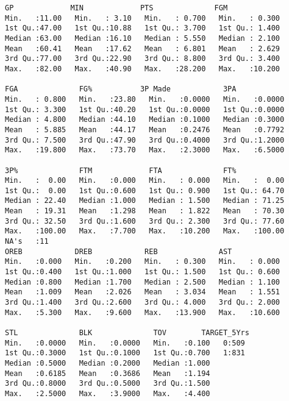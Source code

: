 \documentclass[10pt]{article}
\begin{document}
\begin{verbatim}
GP             MIN             PTS              FGM        
Min.   :11.00   Min.   : 3.10   Min.   : 0.700   Min.   : 0.300  
1st Qu.:47.00   1st Qu.:10.88   1st Qu.: 3.700   1st Qu.: 1.400  
Median :63.00   Median :16.10   Median : 5.550   Median : 2.100  
Mean   :60.41   Mean   :17.62   Mean   : 6.801   Mean   : 2.629  
3rd Qu.:77.00   3rd Qu.:22.90   3rd Qu.: 8.800   3rd Qu.: 3.400  
Max.   :82.00   Max.   :40.90   Max.   :28.200   Max.   :10.200  

FGA              FG%           3P Made            3PA        
Min.   : 0.800   Min.   :23.80   Min.   :0.0000   Min.   :0.0000  
1st Qu.: 3.300   1st Qu.:40.20   1st Qu.:0.0000   1st Qu.:0.0000  
Median : 4.800   Median :44.10   Median :0.1000   Median :0.3000  
Mean   : 5.885   Mean   :44.17   Mean   :0.2476   Mean   :0.7792  
3rd Qu.: 7.500   3rd Qu.:47.90   3rd Qu.:0.4000   3rd Qu.:1.2000  
Max.   :19.800   Max.   :73.70   Max.   :2.3000   Max.   :6.5000  

3P%              FTM             FTA              FT%        
Min.   :  0.00   Min.   :0.000   Min.   : 0.000   Min.   :  0.00  
1st Qu.:  0.00   1st Qu.:0.600   1st Qu.: 0.900   1st Qu.: 64.70  
Median : 22.40   Median :1.000   Median : 1.500   Median : 71.25  
Mean   : 19.31   Mean   :1.298   Mean   : 1.822   Mean   : 70.30  
3rd Qu.: 32.50   3rd Qu.:1.600   3rd Qu.: 2.300   3rd Qu.: 77.60  
Max.   :100.00   Max.   :7.700   Max.   :10.200   Max.   :100.00  
NA's   :11                                                        
OREB            DREB            REB              AST        
Min.   :0.000   Min.   :0.200   Min.   : 0.300   Min.   : 0.000  
1st Qu.:0.400   1st Qu.:1.000   1st Qu.: 1.500   1st Qu.: 0.600  
Median :0.800   Median :1.700   Median : 2.500   Median : 1.100  
Mean   :1.009   Mean   :2.026   Mean   : 3.034   Mean   : 1.551  
3rd Qu.:1.400   3rd Qu.:2.600   3rd Qu.: 4.000   3rd Qu.: 2.000  
Max.   :5.300   Max.   :9.600   Max.   :13.900   Max.   :10.600  

STL              BLK              TOV        TARGET_5Yrs
Min.   :0.0000   Min.   :0.0000   Min.   :0.100   0:509      
1st Qu.:0.3000   1st Qu.:0.1000   1st Qu.:0.700   1:831      
Median :0.5000   Median :0.2000   Median :1.000              
Mean   :0.6185   Mean   :0.3686   Mean   :1.194              
3rd Qu.:0.8000   3rd Qu.:0.5000   3rd Qu.:1.500              
Max.   :2.5000   Max.   :3.9000   Max.   :4.400              

\end{verbatim}
\end{document}
